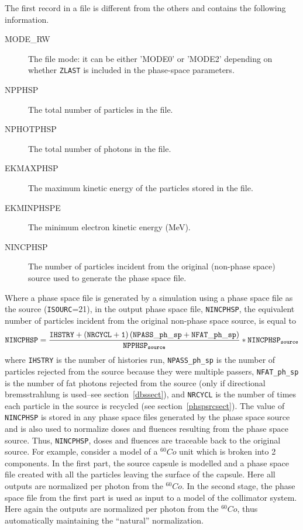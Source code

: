 \documentclass[12pt,twoside]{article}
\begin{document}
The first record in a file is different from the others and contains
the following information.
\begin{description}
\item [MODE\_RW] The file mode: it can be either 'MODE0' or 'MODE2' depending
on whether
\verb+ZLAST+ is included in the phase-space parameters.
\item [NPPHSP] The total number of particles in the file.
\item [NPHOTPHSP] The total number of photons in the file.
\item [EKMAXPHSP] The maximum kinetic energy of the particles stored in
the file.
\item [EKMINPHSPE] The minimum electron kinetic energy (MeV).
\item [NINCPHSP] The number of particles incident from the original (non-phase
               space) source used to generate the phase space file.
\end{description}

Where a phase space file is generated by a simulation using a phase space
file as the  source
(\verb+ISOURC+=21), in the output phase space file, \verb+NINCPHSP+,
the equivalent number of particles incident
from the original non-phase space source,  is equal to
\[{\tt NINCPHSP}=
\frac{{\tt IHSTRY+\left(NRCYCL+1\right)\left(NPASS\_ph\_sp+NFAT\_ph\_sp\right)}}
     {{\tt NPPHSP_{source}}}*{\tt NINCPHSP_{source}}
\]
where \verb+IHSTRY+ is the number of histories run,
{\tt NPASS\_ph\_sp} is the number of particles rejected from the source
because they were multiple passers, {\tt NFAT\_ph\_sp} is the number
of fat photons rejected from the source (only if directional bremsstrahlung
is used--see section~\ref{dbssect}), and {\tt NRCYCL} is the number
of times each particle in the source is recycled (see section~\ref{phspsrcsect}).  The value of
\verb+NINCPHSP+ is stored
in any phase space files generated by the phase space source
and is also used to normalize doses and fluences resulting from the phase
space source.
Thus, \verb+NINCPHSP+, doses and fluences are traceable back to
the original source. For example, consider a model of a $^{60}Co$ unit
which is broken into 2 components. In the first part, the source capsule
is modelled and a phase space file created with all the particles
leaving the surface of the capsule.  Here all outputs are normalized
per photon from the $^{60}Co$.  In the second stage, the phase
space file from the first part is used as input to a model of the
collimator system.  Here again the outputs are normalized per photon
from the $^{60}Co$, thus automatically maintaining the
``natural'' normalization.
\end{document}

